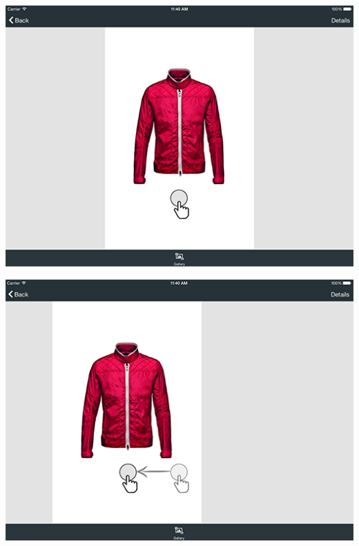 \vspace{1em}
\noindent
\begin{minipage}{\textwidth}
  \begin{minipage}[b]{0.49\textwidth}
    \centering
    \includegraphics[scale=0.25]{../immagini/swipe-start}
	\end{minipage}
	  \hfill
  \begin{minipage}[b]{0.49\textwidth}
    \centering
  \includegraphics[scale=0.25]{../immagini/swipe-follow}
  \end{minipage}
\end{minipage}

